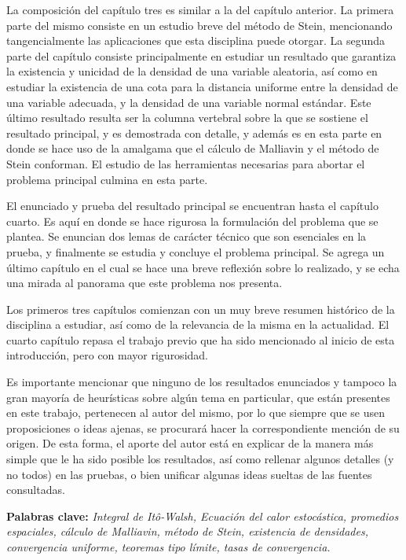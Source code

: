 \documentclass[letterpaper,twoside,12pt]{book}
\newcommand{\1}{\mathds{1}}
\theoremstyle{definition}
\theoremstyle{definition}
\theoremstyle{remark}
\theoremstyle{definition}
\theoremstyle{definition}
\theoremstyle{definition}
\theoremstyle{definition}
\theoremstyle{definition}
\begin{document}
La composición del capítulo tres es similar a la del capítulo anterior. La primera parte del mismo consiste en un estudio breve del método de Stein, mencionando tangencialmente las aplicaciones que esta disciplina puede otorgar. La segunda parte del capítulo consiste principalmente en estudiar un resultado que garantiza la existencia y unicidad de la densidad de una variable aleatoria, así como en estudiar la existencia de una cota para la distancia uniforme entre la densidad de una variable adecuada, y la densidad de una variable normal estándar. Este último resultado resulta ser la columna vertebral sobre la que se sostiene el resultado principal, y es demostrada con detalle, y además es en esta parte en donde se hace uso de la amalgama que el cálculo de Malliavin y el método de Stein conforman. El estudio de las herramientas necesarias para abortar el problema principal culmina en esta parte.

El enunciado y prueba del resultado principal se encuentran hasta el capítulo cuarto. Es aquí en donde se hace rigurosa la formulación del problema que se plantea. Se enuncian dos lemas de carácter técnico que son esenciales en la prueba, y finalmente se estudia y concluye el problema principal. Se agrega un último capítulo en el cual se hace una breve reflexión sobre lo realizado, y se echa una mirada al panorama que este problema nos presenta.

Los primeros tres capítulos comienzan con un muy breve resumen histórico de la disciplina a estudiar, así como de la relevancia de la misma en la actualidad. El cuarto capítulo repasa el trabajo previo que ha sido mencionado al inicio de esta introducción, pero con mayor rigurosidad. 

Es importante mencionar que ninguno de los resultados enunciados y tampoco la gran mayoría de heurísticas sobre algún tema en particular, que están presentes en este trabajo, pertenecen al autor del mismo, por lo que siempre que se usen proposiciones o ideas ajenas, se procurará hacer la correspondiente mención de su origen. De esta forma, el aporte del autor está en explicar de la manera más simple que le ha sido posible los resultados, así como rellenar algunos detalles (y no todos) en las pruebas, o bien unificar algunas ideas sueltas de las fuentes consultadas. 


\textbf{Palabras clave:} \textit{Integral de Itô-Walsh, Ecuación del calor estocástica, promedios espaciales, cálculo de Malliavin, método de Stein, existencia de densidades, convergencia uniforme, teoremas tipo límite, tasas de convergencia.}
\end{document}
